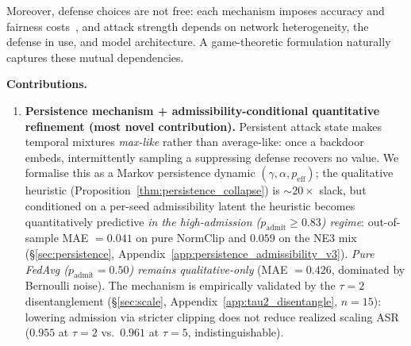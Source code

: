 \documentclass{article}
\begin{document}
Moreover, defense choices are not free: each mechanism imposes accuracy and fairness costs~\citep{wang2020attack}, and attack strength depends on network heterogeneity, the defense in use, and model architecture. A game-theoretic formulation naturally captures these mutual dependencies.

\textbf{Contributions.}
\begin{enumerate}
    \item \textbf{Persistence mechanism + admissibility-conditional quantitative refinement (most novel contribution).} Persistent attack state makes temporal mixtures \emph{max-like} rather than average-like: once a backdoor embeds, intermittently sampling a suppressing defense recovers no value. We formalise this as a Markov persistence dynamic $(\gamma, \alpha, p_{\mathrm{eff}})$; the qualitative heuristic (Proposition~\ref{thm:persistence_collapse}) is $\sim 20\times$ slack, but conditioned on a per-seed admissibility latent the heuristic becomes quantitatively predictive \emph{in the high-admission ($p_{\mathrm{admit}} \geq 0.83$) regime}: out-of-sample MAE $= 0.041$ on pure NormClip and $0.059$ on the NE3 mix (§\ref{sec:persistence}, Appendix~\ref{app:persistence_admissibility_v3}). \emph{Pure FedAvg ($p_{\mathrm{admit}} = 0.50$) remains qualitative-only} (MAE $= 0.426$, dominated by Bernoulli noise). The mechanism is empirically validated by the $\tau{=}2$ disentanglement (§\ref{sec:scale}, Appendix~\ref{app:tau2_disentangle}, $n=15$): lowering admission via stricter clipping does not reduce realized scaling ASR ($0.955$ at $\tau=2$ vs.\ $0.961$ at $\tau=5$, indistinguishable).

\end{enumerate}
\end{document}
